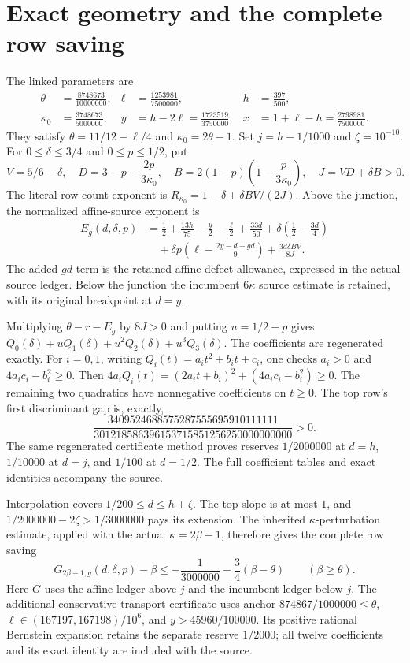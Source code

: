 \documentclass[10pt]{article}
\begin{document}
\section{Exact geometry and the complete row saving}
The linked parameters are
\begin{align*}
 \theta&=\frac{8748673}{10000000},&
 \ell&=\frac{1253981}{7500000},&h&=\frac{397}{500},\\
 \kappa_0&=\frac{3748673}{5000000},&
 y&=h-2\ell=\frac{1723519}{3750000},&
 x&=1+\ell-h=\frac{2798981}{7500000}.
\end{align*}
They satisfy $\theta=11/12-\ell/4$ and $\kappa_0=2\theta-1$.
Set $j=h-1/1000$ and $\zeta=10^{-10}$.
For $0\le\delta\le3/4$ and $0\le p\le1/2$, put
\[
 V=5/6-\delta,\quad D=3-p-\frac{2p}{3\kappa_0},\quad
 B=2(1-p)\left(1-\frac p{3\kappa_0}\right),\quad J=VD+\delta B>0.
\]
The literal row-count exponent is
$R_{\kappa_0}=1-\delta+\delta BV/(2J)$.
Above the junction, the normalized affine-source exponent is
\begin{align*}
 E_g(d,\delta,p)
 &=\frac12+\frac{13h}{75}-\frac y2-\frac\ell2+\frac{33d}{50}
 +\delta\left(\frac12-\frac{3d}{4}\right)\\
 &\quad+\delta p\left(\ell-\frac{2y-d+gd}{9}\right)
 +\frac{3d\delta BV}{8J}.
\end{align*}
The added $gd$ term is the retained affine defect allowance, expressed in
the actual source ledger. Below the junction the incumbent $6\kappa$ source
estimate is retained, with its original breakpoint at $d=y$.

Multiplying $\theta-r-E_g$ by $8J>0$ and putting $u=1/2-p$ gives
$Q_0(\delta)+uQ_1(\delta)+u^2Q_2(\delta)+u^3Q_3(\delta)$.
The coefficients are regenerated exactly. For $i=0,1$, writing
$Q_i(t)=a_it^2+b_it+c_i$, one checks $a_i>0$ and $4a_ic_i-b_i^2\ge0$.
Then $4a_iQ_i(t)=(2a_it+b_i)^2+(4a_ic_i-b_i^2)\ge0$.
The remaining two quadratics have nonnegative coefficients on $t\ge0$.
The top row's first discriminant gap is, exactly,
\[
 \frac{3409524688575287555695910111111}
 {301218586396153715851256250000000000}>0.
\]
The same regenerated certificate method proves reserves $1/2000000$ at
$d=h$, $1/10000$ at $d=j$, and $1/100$ at $d=1/2$.
The full coefficient tables and exact identities accompany the source.

Interpolation covers $1/200\le d\le h+\zeta$. The top slope is at most $1$,
and $1/2000000-2\zeta>1/3000000$ pays its extension. The inherited
$\kappa$-perturbation estimate, applied with the actual $\kappa=2\beta-1$,
therefore gives the complete row saving
\begin{equation}\label{eq:feedback}
 G_{2\beta-1,g}(d,\delta,p)-\beta
 \le-\frac1{3000000}-\frac34(\beta-\theta)
 \qquad(\beta\ge\theta).
\end{equation}
Here $G$ uses the affine ledger above $j$ and the incumbent ledger below $j$.
The additional conservative transport certificate uses anchor
$874867/1000000\le\theta$, $\ell\in(167197,167198)/10^6$, and
$y>45960/100000$. Its positive rational Bernstein expansion retains the
separate reserve $1/2000$; all twelve coefficients and its exact identity
are included with the source.
\end{document}
